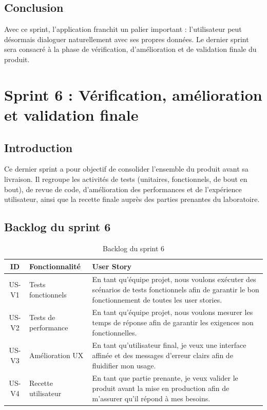 \section*{Conclusion}
Avec ce sprint, l'application franchit un palier important : l'utilisateur peut
désormais dialoguer naturellement avec ses propres données. Le dernier sprint sera
consacré à la phase de vérification, d'amélioration et de validation finale du
produit.


\chapter{Sprint 6 : Vérification, amélioration et validation finale}

\section*{Introduction}
Ce dernier sprint a pour objectif de consolider l'ensemble du produit avant sa
livraison. Il regroupe les activités de tests (unitaires, fonctionnels, de bout en
bout), de revue de code, d'amélioration des performances et de l'expérience
utilisateur, ainsi que la recette finale auprès des parties prenantes du
laboratoire.

\section{Backlog du sprint 6}
\begin{table}[h!]
\centering
\caption{Backlog du sprint 6}
\label{tab:backlog-sprint6}
\renewcommand{\arraystretch}{1.3}
\begin{tabularx}{\textwidth}{|c|l|X|}
\hline
\textbf{ID} & \textbf{Fonctionnalité} & \textbf{User Story} \\ \hline
US-V1 & Tests fonctionnels &
En tant qu'équipe projet, nous voulons exécuter des scénarios de tests fonctionnels
afin de garantir le bon fonctionnement de toutes les user stories. \\ \hline
US-V2 & Tests de performance &
En tant qu'équipe projet, nous voulons mesurer les temps de réponse afin de garantir
les exigences non fonctionnelles. \\ \hline
US-V3 & Amélioration UX &
En tant qu'utilisateur final, je veux une interface affinée et des messages d'erreur
clairs afin de fluidifier mon usage. \\ \hline
US-V4 & Recette utilisateur &
En tant que partie prenante, je veux valider le produit avant la mise en production
afin de m'assurer qu'il répond à mes besoins. \\ \hline
\end{tabularx}
\end{table}

